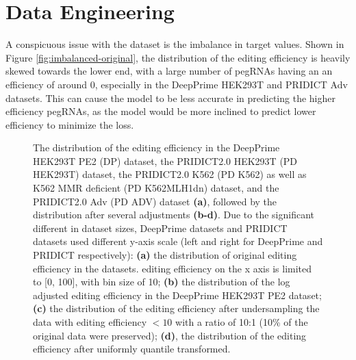 \section{Data Engineering}
\label{sec:data-engineering}

A conspicuous issue with the dataset is the imbalance in target values. Shown in Figure \ref{fig:imbalanced-original}, the distribution of the editing efficiency is heavily skewed towards the lower end, with a large number of pegRNAs having an an efficiency of around 0, especially in the DeepPrime HEK293T and PRIDICT Adv datasets. This can cause the model to be less accurate in predicting the higher efficiency pegRNAs, as the model would be more inclined to predict lower efficiency to minimize the loss. 

\begin{figure}
    \centering
    \caption[Target Distribution Imbalance]{The distribution of the editing efficiency in the DeepPrime HEK293T PE2 (DP) dataset, the PRIDICT2.0 HEK293T (PD HEK293T) dataset, the PRIDICT2.0 K562 (PD K562) as well as K562 MMR deficient (PD K562MLH1dn) dataset, and the PRIDICT2.0 Adv (PD ADV) dataset \textbf{(a)}, followed by the distribution after several adjustments \textbf{(b-d)}. Due to the significant different in dataset sizes, DeepPrime datasets and PRIDICT datasets used different y-axis scale (left and right for DeepPrime and PRIDICT respectively): 
    \textbf{(a)} the distribution of original editing efficiency in the datasets. editing efficiency on the x axis is limited to [0, 100], with bin size of 10; \textbf{(b)} the distribution of the log adjusted editing efficiency in the DeepPrime HEK293T PE2 dataset; \textbf{(c)} the distribution of the editing efficiency after undersampling the data with editing efficiency $<10$ with a ratio of 10:1 (10\% of the original data were preserved); \textbf{(d)}, the distribution of the editing efficiency after uniformly quantile transformed.}
    \label{fig:imbalanced}
\end{figure}

